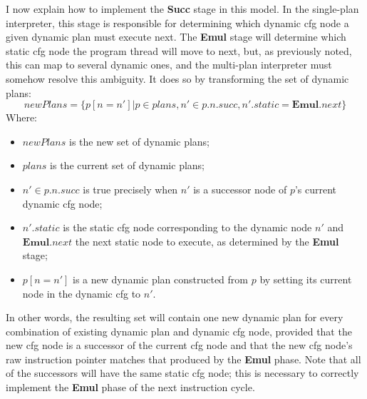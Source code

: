 I now explain how to implement the \textbf{Succ} stage in this model.
In the single-plan interpreter, this stage is responsible for
determining which dynamic \gls{cfg} node a given dynamic plan must
execute next.  The \textbf{Emul} stage will determine which static
\gls{cfg} node the program thread will move to next, but, as
previously noted, this can map to several dynamic ones, and the
multi-plan interpreter must somehow resolve this ambiguity.  It does
so by transforming the set of dynamic plans:
\begin{displaymath}
\mathit{newPlans} = \{p[n = n'] | p \in \mathit{plans}, n' \in p.n.\mathit{succ}, n'.\mathit{static} = \mathbf{Emul}.\mathit{next} \}
\end{displaymath}
Where:
\begin{itemize}
\item $\mathit{newPlans}$ is the new set of dynamic plans;
\item $\mathit{plans}$ is the current set of dynamic plans;
\item $n' \in p.n.\mathit{succ}$ is true precisely when $n'$ is a
  successor node of $p$'s current dynamic \gls{cfg} node;
\item $n'.\mathit{static}$ is the static \gls{cfg} node corresponding
  to the dynamic node $n'$ and $\mathbf{Emul}.\mathit{next}$ the next
  static node to execute, as determined by the \textbf{Emul} stage;
\item $p[n = n']$ is a new dynamic plan constructed from $p$ by
  setting its current node in the dynamic \gls{cfg} to
  $n'$.
\end{itemize}
In other words, the resulting set will contain one new dynamic plan
for every combination of existing dynamic plan and dynamic \gls{cfg}
node, provided that the new \gls{cfg} node is a successor of the
current \gls{cfg} node and that the new \gls{cfg} node's raw
instruction pointer matches that produced by the \textbf{Emul} phase.
Note that all of the successors will have the same static \gls{cfg}
node; this is necessary to correctly implement the \textbf{Emul} phase
of the next instruction cycle.


